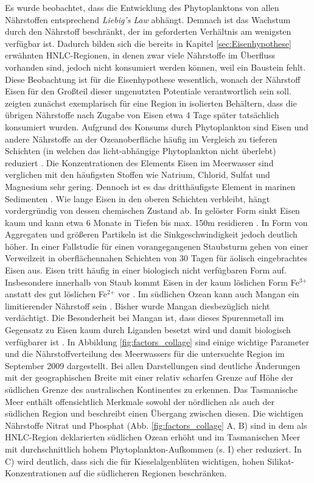\documentclass[12pt,a4paper,onecolumn]{scrartcl}
\begin{document}
Es wurde beobachtet, dass die Entwicklung des Phytoplanktons von allen Nährstoffen entsprechend \textit{Liebig's Law} abhängt. Demnach ist das Wachstum durch den Nährstoff beschränkt, der im geforderten Verhältnis am wenigsten verfügbar ist. Dadurch bilden sich die bereits in Kapitel \ref{sec:Eisenhypothese} erwähnten HNLC-Regionen, in denen zwar viele Nährstoffe im Überfluss vorhanden sind, jedoch nicht konsumiert werden können, weil ein Baustein fehlt. Diese Beobachtung ist für die Eisenhypothese wesentlich, wonach der Nährstoff Eisen für den Großteil dieser ungenutzten Potentiale verantwortlich sein soll. \citet{Martin.1988} zeigten zunächst exemplarisch für eine Region in isolierten Behältern, dass die übrigen Nährstoffe nach Zugabe von Eisen etwa 4 Tage später tatsächlich konsumiert wurden. Aufgrund des Konsums durch Phytoplankton sind Eisen und andere Nährstoffe an der Ozeanoberfläche häufig im Vergleich zu tieferen Schichten (in welchen das licht-abhängige Phytoplankton nicht überlebt) reduziert \citep{Martin.1990}. Die Konzentrationen des Elements Eisen im Meerwasser sind verglichen mit den häufigsten Stoffen wie Natrium, Chlorid, Sulfat und Magnesium sehr gering. Dennoch ist es das dritthäufigste Element in marinen Sedimenten \citep{Emerson.2009}. Wie lange Eisen in den oberen Schichten verbleibt, hängt vordergründig von dessen chemischen Zustand ab. In gelöster Form sinkt Eisen kaum und kann etwa 6 Monate in Tiefen bis max. 150m residieren \citep{Hayes.2015}. In Form von Aggregaten und größeren Partikeln ist die Sinkgeschwindigkeit jedoch deutlich höher. In einer Fallstudie für einen vorangegangenen Staubsturm gehen \citet{Boyd.2010} von einer Verweilzeit in oberflächennahen Schichten von 30 Tagen für äolisch eingebrachtes Eisen aus. Eisen tritt häufig in einer biologisch nicht verfügbaren Form auf. Insbesondere innerhalb von Staub kommt Eisen in der kaum löslichen Form Fe$^\text{3+}$ anstatt des gut löslichen Fe$^\text{2+}$ vor \citep{Reynolds.2014}. Im südlichen Ozean kann auch Mangan ein limitierender Nährstoff sein \citep{Browning.2021}. Bisher wurde Mangan diesbezüglich nicht verdächtigt. Die Besonderheit bei Mangan ist, dass dieses Spurenmetall im Gegensatz zu Eisen kaum durch Liganden besetzt wird und damit biologisch verfügbarer ist \citep{Emerson.2009}. In Abbildung \ref{fig:factors_collage} sind einige wichtige Parameter und die Nährstoffverteilung des Meerwassers für die untersuchte Region im September 2009 dargestellt. Bei allen Darstellungen sind deutliche Änderungen mit der geographischen Breite mit einer relativ scharfen Grenze auf Höhe der südlichen Grenze des australischen Kontinentes zu erkennen. Das Tasmanische Meer enthält offensichtlich Merkmale sowohl der nördlichen als auch der südlichen Region und beschreibt einen Übergang zwischen diesen. Die wichtigen Nährstoffe Nitrat und Phosphat (Abb. \ref{fig:factors_collage} A, B) sind in dem als HNLC-Region deklarierten südlichen Ozean erhöht und im Tasmanischen Meer mit durchschnittlich hohem Phytoplankton-Aufkommen (s. I) eher reduziert. In C) wird deutlich, dass sich die für Kieselalgenblüten wichtigen, hohen Silikat-Konzentrationen auf die südlicheren Regionen beschränken.
\end{document}

